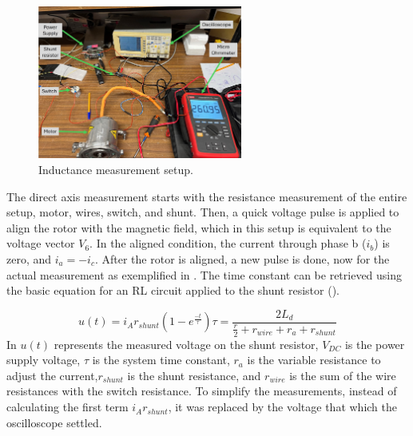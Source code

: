 \begin{figure}[!htb]
	\centering
	\includegraphics[width=0.6\textwidth]{Figures/induc_test.jpg}
	\caption[Inductance measurement setup.]{Inductance measurement setup.}
	\label{fig:induc_setup} %
\end{figure}

The direct axis measurement starts with the resistance measurement of the entire setup, motor, wires, switch, and shunt. Then, a quick voltage pulse is applied to align the rotor with the magnetic field, which in this setup is equivalent to the voltage vector $V_6$. In the aligned condition, the current through phase b ($i_b$) is zero, and $i_a = -i_c$. After the rotor is aligned, a new pulse is done, now for the actual measurement as exemplified in . The time constant can be retrieved using the basic equation for an RL circuit applied to the shunt resistor ().

\begin{subequations}
	\begin{equation}
		u(t) = i_A r_{shunt}(1-e^{\frac{-t}{\tau}})
		\label{eq:rl_circuit}
	\end{equation}
	\begin{equation}
		\tau = \frac{2L_d}{\frac{r}{2}+r_{wire} + r_a + r_{shunt}}
		\label{eq:tau}
	\end{equation}
\end{subequations}
In  $u(t)$ represents the measured voltage on the shunt resistor, $V_{DC}$ is the power supply voltage, $\tau$ is the system time constant, $r_a$ is the variable resistance to adjust the current,$r_{shunt}$ is the shunt resistance, and $r_{wire}$ is the sum of the wire resistances with the switch resistance. To simplify the measurements, instead of calculating the first term $i_A r_{shunt}$, it was replaced by the voltage that which the oscilloscope settled.

